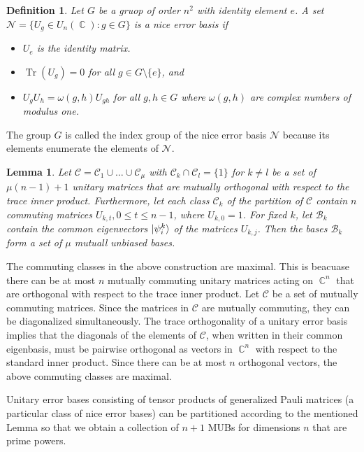 \documentclass[a4paper]{article}
\DeclareMathOperator{\C}{\mathbb{C}}
\DeclareMathOperator{\Tr}{Tr}
\newtheorem{definition}{Definition}
\newtheorem{lemma}{Lemma}
\begin{document}
  \begin{definition}
    Let $G$ be a gruop of order $n^2$ with identity element
    $e$. A set $\mathcal{N} = \{U_g \in U_n(\C) : g \in G\}$ 
    is a nice error basis if
    \begin{itemize}
      \item $U_e$ is the identity matrix.
      \item $\Tr(U_g) = 0$ for all $g \in G \setminus
        \{e\}$, and
      \item $U_g U_h = \omega(g,h)U_{gh}$ for all $g,h \in
        G$ where $\omega(g,h)$ are complex numbers of
        modulus one.
    \end{itemize}
  \end{definition}
  The group $G$ is called the index group of the nice error
  basis $\mathcal{N}$ because its elements enumerate the
  elements of $\mathcal{N}$. 

  \begin{lemma}
    Let $\mathcal{C} = \mathcal{C}_1 \cup \ldots \cup
    \mathcal{C}_\mu$ with $\mathcal{C}_k \cap \mathcal{C}_l
    = \{1\}$ for $k \neq l$ be a set of $\mu(n-1) + 1$ 
    unitary matrices that are mutually orthogonal with
    respect to the trace inner product. Furthermore, let
    each class $\mathcal{C}_k$ of the partition of
    $\mathcal{C}$ contain $n$ commuting matrices $U_{k,t}, 0
    \leq t \leq n-1$, where $U_{k,0} = 1$. For fixed $k$,
    let $\mathcal{B}_k$ contain the common eigenvectors
    $\ket{\psi_i^{k}}$ of the matrices $U_{k,j}$. Then the
    bases $\mathcal{B}_k$ form a set of $\mu$ mutuall
    unbiased bases.
  \end{lemma}

  The commuting classes in the above construction are
  maximal. This is beacuase there can be at most $n$
  mutually commuting unitary matrices acting on $\C^{n}$ 
  that are orthogonal with respect to the trace inner
  product. Let $\mathcal{C}$ be a set of mutually commuting
  matrices. Since the matrices in $\mathcal{C}$ are mutually
  commuting, they can be diagonalized simultaneously. The
  trace orthogonality of a unitary error basis implies that
  the diagonals of the elements of $\mathcal{C}$, when
  written in their common eigenbasis, must be pairwise
  orthogonal as vectors in $\C^{n}$ with respect to the
  standard inner product. Since there can be at most $n$ 
  orthogonal vectors, the above commuting classes are
  maximal.

  Unitary error bases consisting of tensor products of
  generalized Pauli matrices (a particular class of nice
  error bases) can be partitioned according to the mentioned
  Lemma so that we obtain a collection of $n+1$ MUBs for
  dimensions $n$ that are prime powers.
\end{document}
